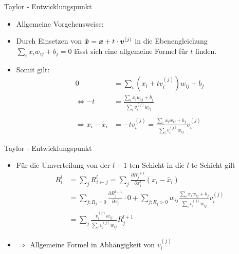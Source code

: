 \begin{frame}{Taylor - Entwicklungspunkt}
\begin{itemize}
\item Allgemeine Vorgehensweise: 
\item Durch Einsetzen von $\tilde{\boldsymbol{x}}=\boldsymbol{x}	+ t \cdot \boldsymbol{v}^{(j)}$ in die Ebenengleichung $\sum_{i} \tilde{x}_{i} w_{i j}+b_{j} = 0$ lässt sich eine allgemeine Formel für $t$ finden.
\item Somit gilt: 
\begin{align*}
0 &= \sum_{i} \left(x_{i} + t v_i^{(j)} \right) w_{i j}+b_{j} \\
\Leftrightarrow -t& =\frac{\sum_{i} x_{i} w_{i j}+b_{j}}{\sum_{i} v_{i}^{(j)} w_{i j}}\\
\ \\
\Rightarrow x_i - \tilde{x_i} &= -t v_i^{(j)} = \frac{\sum_{i} x_{i} w_{i j}+b_{j}}{\sum_{i} v_{i}^{(j)} w_{i j}} v_i^{(j)}
\end{align*}
\end{itemize}
\end{frame}

\begin{frame}{Taylor - Entwicklungspunkt}
\begin{itemize}
\item Für die Umverteilung von der $l+1$-ten Schicht in die $l$-te Schicht gilt
\begin{align*}
R_i^l &= \sum_{j} R_{i \leftarrow j}^l =  \sum_{j} \frac{\partial R_{j}^{l+1}}{\partial x_{i}^l}
(x_i - \tilde{x_i}) \\
&= \sum_{j : R_j = 0} \frac{\partial R_{j}^{l+1}}{\partial x_{i}^l} \cdot 0 + \sum_{j: R_j>0} w_{ij} \frac{\sum_{i} x_{i} w_{i j}+b_{j}}{\sum_{i} v_{i}^{(j)} w_{i j}} v_i^{(j)} \\
&= \sum_{j} \frac{v_i^{(j)}  w_{i j}}{\sum_{i} v_{i}^{(j)} w_{i j}} R_j^{l+1}
\end{align*}
\item $\Rightarrow$ Allgemeine Formel in Abhängigkeit von $v_i^{(j)}$
\end{itemize}
\end{frame}

